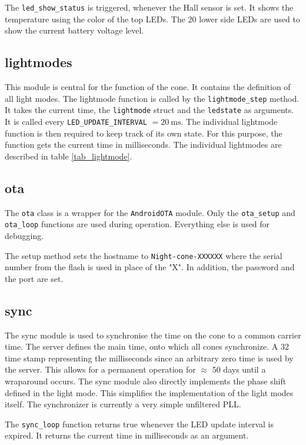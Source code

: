 The \texttt{led\_show\_status} is triggered, whenever the Hall sensor is set. It shows the temperature using the color of the top \acp{LED}. The 20 lower side \acp{LED} are used to show the current battery voltage level. 

\subsection{lightmodes}
This module is central for the function of the cone. It contains the definition of all light modes. The lightmode function is called by the \texttt{lightmode\_step} method. It takes the current time, the \texttt{lightmode} struct and the \texttt{ledstate} as arguments. It is called every \texttt{LED\_UPDATE\_INTERVAL} $= \qty{20}{\milli\s}$. The individual lightmode function is then required to keep track of its own state. For this purpose, the function gets the current time in milliseconds. The individual lightmodes are described in table \ref{tab_lightmode}. 

\subsection{ota}
The \texttt{ota} class is a wrapper for the \texttt{AndroidOTA} module. Only the \texttt{ota\_setup} and \texttt{ota\_loop} functions are used during operation. Everything else is used for debugging. 

The setup method sets the hostname to \texttt{Night-cone-XXXXXX} where the serial number from the flash is used in place of the "X". In addition, the password and the port are set. 


\subsection{sync}
The sync module is used to synchronise the time on the cone to a common carrier time. The server defines the main time, onto which all cones synchronize. A \qty{32}{\bit} time stamp representing the milliseconds since an arbitrary zero time is used by the server. This allows for a permanent operation for $\approx$ 50 days until a wraparound occurs. The sync module also directly implements the phase shift defined in the light mode. This simplifies the implementation of the light modes itself. The synchronizer is currently a very simple unfiltered \ac{PLL}. 

The \texttt{sync\_loop} function returns true whenever the \ac{LED} update interval is expired. It returns the current time in milliseconds as an argument. 

